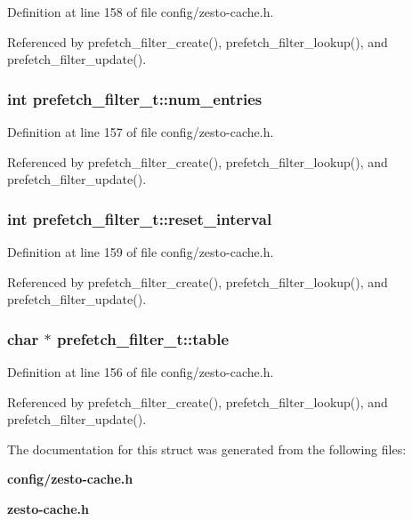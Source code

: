 Definition at line 158 of file config/zesto-cache.h.

Referenced by prefetch\_\-filter\_\-create(), prefetch\_\-filter\_\-lookup(), and prefetch\_\-filter\_\-update().
\subsubsection[{num\_\-entries}]{\setlength{\rightskip}{0pt plus 5cm}int {\bf prefetch\_\-filter\_\-t::num\_\-entries}}\label{structprefetch__filter__t_ee2e0af81b5ac0625094f2dc8d7f9bed}




Definition at line 157 of file config/zesto-cache.h.

Referenced by prefetch\_\-filter\_\-create(), prefetch\_\-filter\_\-lookup(), and prefetch\_\-filter\_\-update().
\subsubsection[{reset\_\-interval}]{\setlength{\rightskip}{0pt plus 5cm}int {\bf prefetch\_\-filter\_\-t::reset\_\-interval}}\label{structprefetch__filter__t_d1755a33ce203e405d91fcd6930ebb50}




Definition at line 159 of file config/zesto-cache.h.

Referenced by prefetch\_\-filter\_\-create(), prefetch\_\-filter\_\-lookup(), and prefetch\_\-filter\_\-update().
\subsubsection[{table}]{\setlength{\rightskip}{0pt plus 5cm}char $\ast$ {\bf prefetch\_\-filter\_\-t::table}}\label{structprefetch__filter__t_28b276901350f7f85db7411e22a31743}




Definition at line 156 of file config/zesto-cache.h.

Referenced by prefetch\_\-filter\_\-create(), prefetch\_\-filter\_\-lookup(), and prefetch\_\-filter\_\-update().

The documentation for this struct was generated from the following files:\begin{CompactItemize}
\item 
{\bf config/zesto-cache.h}\item 
{\bf zesto-cache.h}\end{CompactItemize}
